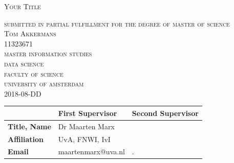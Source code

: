 \begin{titlepage}
\begin{center}

\textsc{\Large   Your Title }

\bigskip

\textsc{\large
submitted in partial fulfillment for the degree of master of science\\
%
\bigskip
Tom Akkermans\\
%
11323671\\
%
\bigskip
master information studies\\
%
data science \\
%
faculty of science\\
%
university of amsterdam\\
%
\bigskip
2018-08-DD
}

\end{center}
 

\vfill

\begin{center}
\begin{tabular}{|l||ll|}
\hline
 & \textbf{First Supervisor} & \textbf{Second Supervisor}  \\   
 \hline
\textbf{Title, Name} & Dr Maarten Marx&  \\
\textbf{Affiliation} &UvA, FNWI, IvI & \\ 
\textbf{Email} & maartenmarx@uva.nl& . \\
\hline
\end{tabular}
\end{center}





\end{titlepage}
